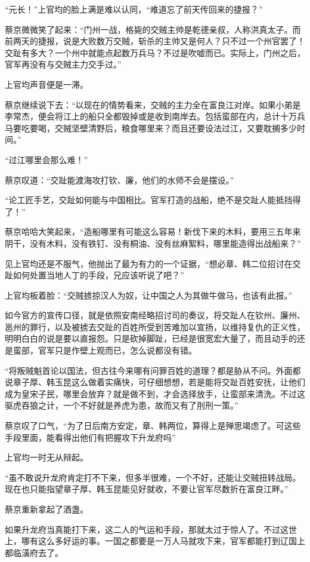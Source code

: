 “元长！”上官均的脸上满是难以认同，“难道忘了前天传回来的捷报？”

蔡京微微笑了起来：“门州一战，格毙的交贼主帅是乾德亲叔，人称洪真太子。而前两天的捷报，说是大败数万交贼，斩杀的主帅又是何人？只不过一个州官罢了！交趾有多大？一个州中就能点起数万兵马？不过是吹嘘而已。实际上，门州之后，官军再没有与交贼主力交手过。”

上官均声音便是一滞。

蔡京继续说下去：“以现在的情势看来，交贼的主力全在富良江对岸。如果小弟是李常杰，便会将江上的船只全都毁掉或是收到南岸去。包括蛮部在内，总计十万兵马要吃要喝，交贼坚壁清野后，粮食哪里来？而且还要设法过江，又要耽搁多少时间。”

“过江哪里会那么难！”

蔡京叹道：“交趾能渡海攻打钦、廉，他们的水师不会是摆设。”

“论工匠手艺，交趾如何能与中国相比。官军打造的战船，绝不是交趾人能抵挡得了！”

蔡京哈哈大笑起来，“造船哪里有可能这么容易！新伐下来的木料，要用三五年来阴干，没有木料，没有铁钉、没有桐油、没有丝麻絮料，哪里能造得出战船来？”

见上官均还是不服气，他抛出了最为有力的一个证据，“想必章、韩二位招讨在交趾如何处置当地人丁的手段，兄应该听说了吧？”

上官均板着脸：“交贼掳掠汉人为奴，让中国之人为其做牛做马，也该有此报。”

如今官方的宣传口径，就是依照安南经略招讨司的奏议，将交趾人在钦州、廉州、邕州的罪行，以及被掳去交趾的百姓所受到苦难加以宣扬，以维持复仇的正义性，明明白白的说是要以直报怨。只是砍掉脚趾，已经是很宽宏大量了，而且动手的还是蛮部，官军只是作壁上观而已，怎么说都没有错。

“将叛贼魁首论以国法，但古往今来哪有问罪百姓的道理？都是胁从不问。外面都说章子厚、韩玉昆这么做着实痛快，可仔细想想，若是能将交趾百姓安抚，让他们成为皇宋子民，哪里会放弃？就是做不到，才会选择放手，让蛮部来清洗。不过这驱虎吞狼之计，一个不好就是养虎为患，故而又有了刖刑一策。”

蔡京叹了口气，“为了日后南方安定，章、韩两位，算得上是殚思竭虑了。可这些手段里面，能看得出他们有把握攻下升龙府吗”

上官均一时无从辩起。

“虽不敢说升龙府肯定打不下来，但多半很难，一个不好，还能让交贼扭转战局。现在也只能指望章子厚、韩玉昆能见好就收，不要让官军尽数折在富良江畔。”

蔡京重新拿起了酒盏。

如果升龙府当真能打下来，这二人的气运和手段，那就太过于惊人了。不过这世上，哪有这么多好运的事。一国之都要是一万人马就攻下来，官军都能打到辽国上都临潢府去了。

